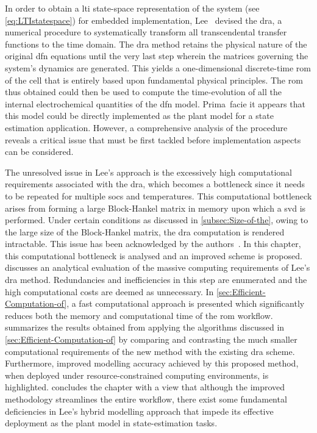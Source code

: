 In  order  to  obtain  a  \gls{lti} state-space  representation  of  the  system
(see \cref{eq:LTIstatespace}) for  embedded implementation,  Lee~\etal{} devised
the   \gls{dra},  a   numerical  procedure   to  systematically   transform  all
transcendental  transfer functions  to  the time  domain.  The \gls{dra}  method
retains  the physical  nature  of  the original  \gls{dfn}  equations until  the
very  last  step  wherein  the  matrices governing  the  system's  dynamics  are
generated. This  yields a  one-dimensional discrete-time  \gls{rom} of  the cell
that is entirely based upon  fundamental physical principles. The \gls{rom} thus
obtained could  then be used to  compute the time-evolution of  all the internal
electrochemical quantities of  the \gls{dfn} model. Prima~facie  it appears that
this  model  could be  directly  implemented  as the  plant  model  for a  state
estimation  application.  However, a  comprehensive  analysis  of the  procedure
reveals  a critical  issue  that  must be  first  tackled before  implementation
aspects can be considered.

The unresolved  issue in  Lee's approach is  the excessively  high computational
requirements associated  with the  \gls{dra}, which  becomes a  bottleneck since
it  needs  to  be  repeated  for multiple  \glspl{soc}  and  temperatures.  This
computational  bottleneck  arises  from  forming  a  large  Block-Hankel  matrix
in  memory  upon  which  a  \gls{svd} is  performed.  Under  certain  conditions
as  discussed  in \cref{subsec:Size-of-the}, owing  to  the  large size  of  the
Block-Hankel  matrix, the  \gls{dra} computation  is rendered  intractable. This
issue  has been  acknowledged by  the authors~\cite{Lee2012,Plett2015}.  In this
chapter, this  computational bottleneck  is analysed and  an improved  scheme is
proposed.    discusses  an  analytical  evaluation  of
the  massive  computing requirements  of  Lee's  \gls{dra} method.  Redundancies
and  inefficiencies in  this  step  are enumerated  and  the high  computational
costs are deemed as  unnecessary. In \cref{sec:Efficient-Computation-of}, a fast
computational  approach  is  presented  which  significantly  reduces  both  the
memory  and computational  time  of the  \gls{rom} workflow.  
summarizes  the   results  obtained  from  applying   the  algorithms  discussed
in \cref{sec:Efficient-Computation-of}  by comparing  and  contrasting the  much
smaller computational requirements of the new method with the existing \gls{dra}
scheme.  Furthermore,  improved modelling  accuracy  achieved  by this  proposed
method,  when deployed  under  resource-constrained  computing environments,  is
highlighted.    concludes  the  chapter with  a  view  that
although the improved  methodology streamlines the entire  workflow, there exist
some fundamental deficiencies in Lee's hybrid modelling approach that impede its
effective deployment as the plant model in state-estimation tasks.

